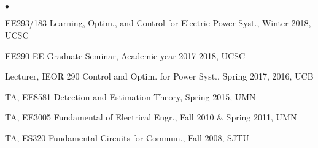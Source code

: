 \documentclass[margin,line]{res}
\newenvironment{list2}{
  \begin{list}{$\bullet$}{%
      \setlength{\itemsep}{0in}
      \setlength{\parsep}{0in} \setlength{\parskip}{0in}
      \setlength{\topsep}{0in} \setlength{\partopsep}{0in}
      \setlength{\leftmargin}{0.10in}}}{\end{list}}
\newenvironment{list3}{
  \begin{list}{$\circ$}{%
      \setlength{\itemsep}{0in}
      \setlength{\parsep}{0in} \setlength{\parskip}{0in}
      \setlength{\topsep}{0in} \setlength{\partopsep}{0in}
      \setlength{\leftmargin}{0.28in}}}{\end{list}}
\begin{document}
\begin{resume}
%
%
%
%
%
%
%
%
%



\section{}

\begin{list2}
\item EE293/183 Learning, Optim., and Control for Electric Power Syst., Winter 2018, UCSC
\item EE290 EE Graduate Seminar, Academic year 2017-2018, UCSC
\item Lecturer, IEOR 290 Control and Optim. for Power Syst., Spring 2017, 2016, UCB
\item TA, EE8581 Detection and Estimation Theory, Spring 2015, UMN
\item TA, EE3005 Fundamental of Electrical Engr., Fall 2010 \& Spring 2011, UMN
\item TA, ES320 Fundamental Circuits for Commun., Fall 2008, SJTU
\end{list2}


\end{resume}
\end{document}

